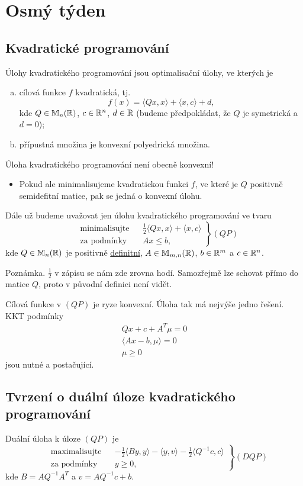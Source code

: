 \section{Osmý týden}
\subsection{Kvadratické programování}
Úlohy kvadratického programování jsou optimalisační úlohy, ve kterých je
\begin{enumerate}[(a)]
    \item cílová funkce $f$ kvadratická, tj.
    \[
        f(x) = \langle Qx, x\rangle + \langle x,c\rangle + d,
    \]
    kde $Q \in \mathbb{M}_n (\mathbb{R})$, $c \in \mathbb{R}^n$, $d \in \mathbb{R}$ (budeme předpokládat, že $Q$ je symetrická a $d=0$);
    \item přípustná množina je konvexní polyedrická množina.
\end{enumerate}
Úloha kvadratického programování není obecně konvexní!
\begin{itemize}
    \item Pokud ale minimalisujeme kvadratickou funkci $f$, ve které je $Q$ positivně semidefitní matice, pak se jedná o 
    konvexní úlohu.
\end{itemize}
Dále už budeme uvažovat jen úlohu kvadratického programování ve tvaru
\[
\left.\begin{aligned}
    &\text{minimalisujte}&& \frac{1}{2}\langle Qx, x \rangle + \langle x,c\rangle \\
    &\text{za podmínky}  && Ax \leq b, 
\end{aligned}
\right\} (QP)
\]
kde $Q \in \mathbb{M}_n(\mathbb{R})$ je positivně \underline{definitní}, $A \in \mathbb{M}_{m,n}(\mathbb{R})$, $b \in \mathbb{R}^m$ a $c \in \mathbb{R}^n$.

Poznámka. $\frac{1}{2}$ v zápisu se nám zde zrovna hodí. Samozřejmě lze schovat přímo do matice $Q$, proto v původní 
definici není vidět.

Cílová funkce v $(QP)$ je ryze konvexní. Úloha tak má nejvýše jedno řešení. KKT podmínky
\begin{align*}
    Qx + c + A^T \mu = 0 \\
    \langle Ax - b, \mu\rangle = 0 \\
    \mu \geq 0
\end{align*}
jsou nutné a postačující.

\subsection{Tvrzení o duální úloze kvadratického programování}
Duální úloha k úloze $(QP)$ je
\[
\left.\begin{aligned}
    &\text{maximalisujte}&& -\frac{1}{2}\langle By, y \rangle - \langle y,v\rangle - \frac{1}{2}\langle Q^{-1}c, c\rangle \\
    &\text{za podmínky}  && y \geq 0, 
\end{aligned}
\right\} (DQP)
\]
kde $B = AQ^{-1}A^T$ a $v = AQ^{-1}c + b$.

